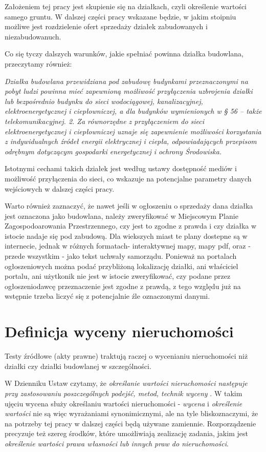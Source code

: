 \documentclass[a4paper,12pt,twoside,openany]{report}
\begin{document}
Założeniem tej pracy jest skupienie się na działkach, czyli określenie wartości samego gruntu. W dalszej części pracy wskazane będzie, w jakim stoipniu możliwe jest rozdzielenie ofert sprzedaży działek zabudowanych i niezabudowanuch.



Co się tyczy dalszych warunków, jakie spełniać powinna działka budowlana, przeczytamy również: 


 \textit {Działka budowlana przewidziana pod zabudowę budynkami przeznaczonymi na pobyt ludzi powinna mieć zapewnioną możliwość przyłączenia uzbrojenia działki lub bezpośrednio budynku do sieci wodociągowej, kanalizacyjnej, elektroenergetycznej i ciepłowniczej, a dla budynków wymienionych w § 56 – także telekomunikacyjnej. 2. Za równorzędne z przyłączeniem do sieci elektroenergetycznej i ciepłowniczej uznaje się zapewnienie możliwości korzystania  z indywidualnych  źródeł  energii  elektrycznej  i ciepła,  odpowiadających  przepisom  odrębnym dotyczącym gospodarki energetycznej i ochrony Środowiska.}\cite{RMI}


Istotnymi cechami takich działek jest według ustawy dostępność mediów i możliwość przyłączenia do sieci, co wskazuje na potencjalne parametry danych wejściowych w dalszej części pracy.


Warto również zaznaczyć, że nawet jeśli w ogłoszeniu o sprzedaży dana działka jest oznaczona jako budowlana, należy zweryfikować w  Miejscowym Planie Zagospodoarowania Przestrzennego, czy jest to zgodne z prawda i czy działka w istocie nadaje się pod zabudową. Dla wiekszych miast te plany dostepne są w internecie, jednak w różnych formatach- interaktywnej mapy, mapy pdf, oraz - przede wszystkim - jako tekst uchwały samorządu. 
Ponieważ na portalach ogłoszeniowych można podać przybliżoną lokalizację działki, ani właściciel portalu, ani użytkonik nie jest w istocie zweryfikować, czy podane przez ogłoszeniodawcę przeznaczenie jest zgodne z prawdą, z tego względu już na wstępnie trzeba liczyć się z potencjalnie źle oznaczonymi danymi.



\section{Definicja wyceny nieruchomości}
Testy źródłowe (akty prawne) traktują raczej o wycenianiu nieruchomości niż działki czy działki budowlanej w szczególności.


W Dzienniku Ustaw czytamy, że \textit{określanie wartości nieruchomości następuje przy zastosowaniu poszczególnych podejść, metod, technik wyceny} \cite{OPRM}. W takim ujęciu wycena służy określaniu wartości nieruchomości - \textit{wycena} i \textit{określenie wartości} nie są więc wyrażaniami synonimicznymi, ale na tyle bliskoznaczymi, że na potrzeby tej pracy w dalszej części będą używane zamiennie.
Rozporządzenie precyzuje też szereg środków, które umożliwiają zealizację zadania, jakim jest \textit {określenie wartości prawa własności lub innych praw do nieruchomości}.
\end{document}
